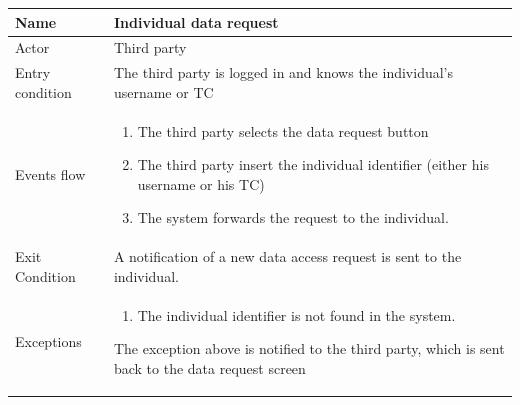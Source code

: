 \begin{tabular}{|l|p{11cm}|}
    \hline
    Name & Individual data request
    \\ \hline
    Actor & Third party
    \\ \hline 
    Entry condition & The third party is logged in and knows the individual's username or TC
        \\ \hline
    Events flow &
    \begin{enumerate}
    \item The third party selects the data request button
	\item The third party insert the individual identifier (either his username or his TC)
	\item The system forwards the request to the individual.
    \end{enumerate}
     \\ \hline
     Exit Condition & A notification of a new data access request is sent to the individual.
     \\
    \hline
    Exceptions &
        \begin{enumerate}
    \item The individual identifier is not found in the system.
    \end{enumerate}
     The exception above is notified to the third party, which is sent back to the data request screen
        \\  \hline

\end{tabular}

\givespace


